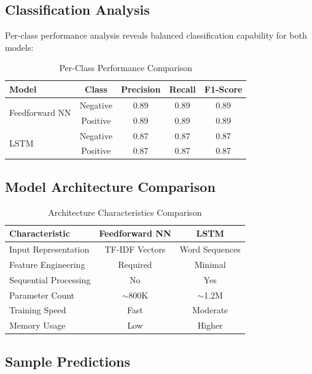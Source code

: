 \documentclass[a4paper, journal]{IEEEtran}
\begin{document}
\subsection{Classification Analysis}

Per-class performance analysis reveals balanced classification capability for both models:

\begin{table}[ht]
\centering
\caption{Per-Class Performance Comparison}
\begin{tabular}{@{}lcccc@{}}
\toprule
\textbf{Model} & \textbf{Class} & \textbf{Precision} & \textbf{Recall} & \textbf{F1-Score} \\
\midrule
\multirow{2}{*}{Feedforward NN} & Negative & 0.89 & 0.89 & 0.89 \\
                                & Positive & 0.89 & 0.89 & 0.89 \\
\midrule
\multirow{2}{*}{LSTM} & Negative & 0.87 & 0.87 & 0.87 \\
                      & Positive & 0.87 & 0.87 & 0.87 \\
\bottomrule
\end{tabular}
\label{tab:class_comparison}
\end{table}

\subsection{Model Architecture Comparison}

\begin{table}[ht]
\centering
\caption{Architecture Characteristics Comparison}

\begin{tabular}{@{}lcc@{}}
\toprule
\textbf{Characteristic} & \textbf{Feedforward NN} & \textbf{LSTM} \\
\midrule
Input Representation & TF-IDF Vectors & Word Sequences \\
Feature Engineering & Required & Minimal \\
Sequential Processing & No & Yes \\
Parameter Count & $\sim$800K & $\sim$1.2M \\
Training Speed & Fast & Moderate \\
Memory Usage & Low & Higher \\
\bottomrule
\end{tabular}
\label{tab:architecture_comparison}
\end{table}

\subsection{Sample Predictions}
\end{document}
